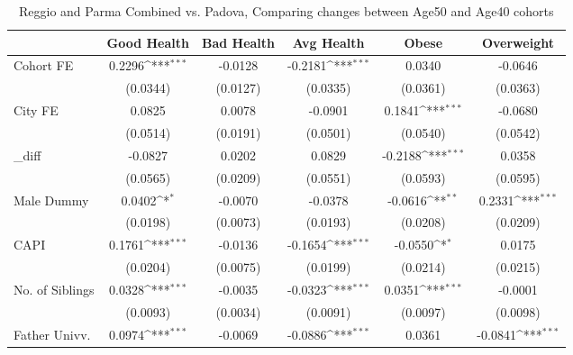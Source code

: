 \begin{table}[htbp]\centering
\def\sym#1{\ifmmode^{#1}\else\(^{#1}\)\fi}
\caption{Reggio and Parma Combined vs. Padova, Comparing changes between Age50 and Age40 cohorts}
\begin{tabular}{l*{5}{c}}
\toprule
            &\multicolumn{1}{c}{Good Health}&\multicolumn{1}{c}{Bad Health}&\multicolumn{1}{c}{Avg Health}&\multicolumn{1}{c}{Obese}&\multicolumn{1}{c}{Overweight}\\
\midrule
Cohort FE   &      0.2296\sym{***}&     -0.0128         &     -0.2181\sym{***}&      0.0340         &     -0.0646         \\
            &    (0.0344)         &    (0.0127)         &    (0.0335)         &    (0.0361)         &    (0.0363)         \\
\addlinespace
City FE     &      0.0825         &      0.0078         &     -0.0901         &      0.1841\sym{***}&     -0.0680         \\
            &    (0.0514)         &    (0.0191)         &    (0.0501)         &    (0.0540)         &    (0.0542)         \\
\addlinespace
\_diff       &     -0.0827         &      0.0202         &      0.0829         &     -0.2188\sym{***}&      0.0358         \\
            &    (0.0565)         &    (0.0209)         &    (0.0551)         &    (0.0593)         &    (0.0595)         \\
\addlinespace
Male Dummy  &      0.0402\sym{*}  &     -0.0070         &     -0.0378         &     -0.0616\sym{**} &      0.2331\sym{***}\\
            &    (0.0198)         &    (0.0073)         &    (0.0193)         &    (0.0208)         &    (0.0209)         \\
\addlinespace
CAPI        &      0.1761\sym{***}&     -0.0136         &     -0.1654\sym{***}&     -0.0550\sym{*}  &      0.0175         \\
            &    (0.0204)         &    (0.0075)         &    (0.0199)         &    (0.0214)         &    (0.0215)         \\
\addlinespace
No. of Siblings&      0.0328\sym{***}&     -0.0035         &     -0.0323\sym{***}&      0.0351\sym{***}&     -0.0001         \\
            &    (0.0093)         &    (0.0034)         &    (0.0091)         &    (0.0097)         &    (0.0098)         \\
\addlinespace
Father Univv.&      0.0974\sym{***}&     -0.0069         &     -0.0886\sym{***}&      0.0361         &     -0.0841\sym{***}\\

\end{tabular}
\end{table}
